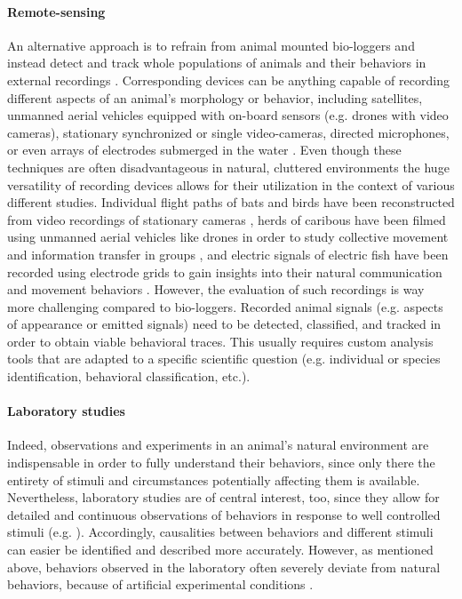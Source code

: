 \documentclass[11pt,pdftex]{article}
\begin{document}
\paragraph{Remote-sensing} 
An alternative approach is to refrain from animal mounted bio-loggers and instead detect and track whole populations of animals and their behaviors in external recordings \citep{Hughey2018}. Corresponding devices can be anything capable of recording different aspects of an animal's morphology or behavior, including satellites, unmanned aerial vehicles equipped with on-board sensors (e.g. drones with video cameras), stationary synchronized or single video-cameras, directed microphones, or even arrays of electrodes submerged in the water \citep{Theriault2014, Henninger2018, Hughey2018}. Even though these techniques are often disadvantageous in natural, cluttered environments \citep{Dell2014} the huge versatility of recording devices allows for their utilization in the context of various different studies. Individual flight paths of bats and birds have been reconstructed from video recordings of stationary cameras \citep{Theriault2014}, herds of caribous have been filmed using unmanned aerial vehicles like drones in order to study collective movement and information transfer in groups \citep{Torney2018}, and electric signals of electric fish have been recorded using electrode grids to gain insights into their natural communication and movement behaviors \citep{Henninger2018, Henninger2020}. However, the evaluation of such recordings is way more challenging compared to bio-loggers. Recorded animal signals (e.g. aspects of appearance or emitted signals) need to be detected, classified, and tracked in order to obtain viable behavioral traces. This usually requires custom analysis tools that are adapted to a specific scientific question (e.g. individual or species identification, behavioral classification, etc.).

\paragraph{Laboratory studies} 
Indeed, observations and experiments in an animal's natural environment are indispensable in order to fully understand their behaviors, since only there the entirety of stimuli and circumstances potentially affecting them is available. Nevertheless, laboratory studies are of central interest, too, since they allow for detailed and continuous observations of behaviors in response to well controlled stimuli (e.g. \citealp{Chivers1995, Barber2000, Hupe2008}). Accordingly, causalities between behaviors and different stimuli can easier be identified and described more accurately. However, as mentioned above, behaviors observed in the laboratory often severely deviate from natural behaviors, because of artificial experimental conditions \citep{Henninger2018}. 
\end{document}
